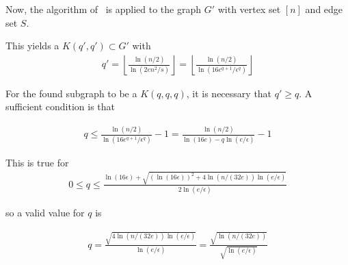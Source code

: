 \documentclass[12pt]{article}
\begin{document}
    Now, the algorithm of~\cite{MUBAYI2010174} is applied to the graph $G'$ with vertex set $[n]$
    and edge set $S$.

    This yields a $K(q', q') \subset G'$ with
    \begin{align*}
        q' = \left \lfloor \frac{\ln(n/2)}{\ln(2en^2/s)} \right \rfloor =
        \left \lfloor \frac{\ln(n/2)}{\ln(16e^{q+1} / \epsilon^q)} \right \rfloor
    \end{align*}

    For the found subgraph to be a $K(q, q, q)$, it is necessary that $q' \geq q$.
    A sufficient condition is that

    \begin{align*}
        q \leq \frac{\ln(n/2)}{\ln(16e^{q+1} / \epsilon^q)} - 1 =
        \frac{\ln(n/2)}{\ln(16e) - q  \ln(e / \epsilon)} - 1
    \end{align*}

    This is true for
    \begin{align*}
        0 \leq q \leq
        \frac
        {\ln(16 \epsilon) + \sqrt {(\ln(16 \epsilon))^2 + 4\ln(n/(32e))\ln(e/ \epsilon)}}
        {2\ln(e / \epsilon)}
    \end{align*}

    so a valid value for $q$ is

    \begin{align*}
        q = \frac{\sqrt {4 \ln(n/(32e))\ln(e/ \epsilon)}}
        {\ln(e / \epsilon)} =
        \frac{\sqrt {\ln(n/(32e))}}
        {\sqrt {\ln(e / \epsilon)}}
    \end{align*}




    
    
\end{document}
